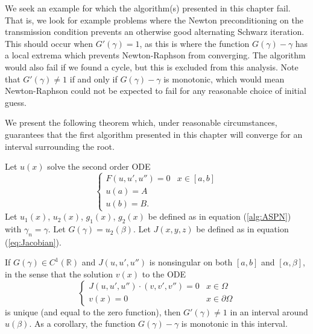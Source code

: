 \documentclass{book}
\begin{document}
We seek an example for which the algorithm(s) presented in this chapter fail.
That is, we look for example problems where the Newton preconditioning on the transmission condition prevents an otherwise good alternating Schwarz iteration.
This should occur when $G'(\gamma)=1$, as this is where the function $G(\gamma)-\gamma$ has a local extrema which prevents Newton-Raphson from converging.
The algorithm would also fail if we found a cycle, but this is excluded from this analysis.
Note that $G'(\gamma) \neq 1$ if and only if $G(\gamma) - \gamma$ is monotonic, which would mean Newton-Raphson could not be expected to fail for any reasonable choice of initial guess.

We present the following theorem which, under reasonable circumstances, guarantees that the first algorithm presented in this chapter will converge for an interval surrounding the root.

\begin{thm}
Let $u(x)$ solve the second order ODE
\begin{equation*}
\begin{cases} F(u,u',u'') = 0 & x \in [a,b] \\ u(a) = A \\
u(b) = B . \end{cases}
\end{equation*}
Let $u_1(x)$, $u_2(x)$, $g_1(x)$, $g_2(x)$ be defined as in equation (\ref{alg:ASPN}) with $\gamma_n = \gamma$.
Let $G(\gamma) = u_2(\beta)$.
Let $J(x,y,z)$ be defined as in equation (\ref{eq:Jacobian}).

If $G(\gamma) \in C^1(\mathbb{R})$ and $J(u,u',u'')$ is nonsingular on both $[a,b]$ and $[\alpha,\beta]$, in the sense that the solution $v(x)$ to the ODE
\begin{equation*}
\begin{cases} J(u,u',u'') \cdot (v, v', v'') = 0 & x \in \Omega \\ v(x) = 0 & x \in \partial \Omega \end{cases}
\end{equation*}
is unique (and equal to the zero function),
then $G'(\gamma) \neq 1$ in an interval around $u(\beta)$.
As a corollary, the function $G(\gamma) - \gamma$ is monotonic in this interval.
\end{thm}
\end{document}
